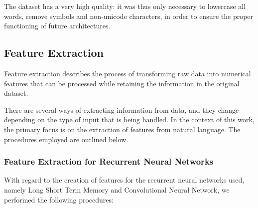 \documentclass[letterpaper,11pt]{article}
\begin{document}
The dataset has a very high quality: it was thus only necessary to lowercase all words, remove symbols and non-unicode characters, in order to ensure the proper functioning of future architectures.

\subsection{Feature Extraction}
\label{subsec:feature_extr}

Feature extraction describes the process of transforming raw data into numerical features that can be processed while retaining the information in the original dataset.

There are several ways of extracting information from data, and they change depending on the type of input that is being handled. In the context of this work, the primary focus is on the extraction of features from natural language. The procedures employed are outlined below.

\subsubsection*{Feature Extraction for Recurrent Neural Networks}

With regard to the creation of features for the recurrent neural networks used, namely Long Short Term Memory and Convolutional Neural Network, we performed the following procedures:
\end{document}
